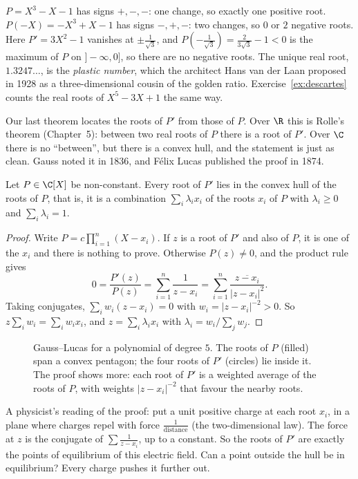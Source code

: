 \begin{examplex}
$P=X^3-X-1$ has signs $+,-,-$: one change, so exactly one positive root. $P(-X)=-X^3+X-1$ has signs $-,+,-$: two changes, so $0$ or $2$ negative
roots. Here $P'=3X^2-1$ vanishes at $\pm\frac1{\sqrt3}$, and $P(-\frac1{\sqrt3})=\frac2{3\sqrt3}-1<0$ is the maximum of $P$ on $]-\infty,0]$, so
there are no negative roots. The unique real root, $1.3247\ldots$, is the \emph{plastic number}, which the architect Hans van der Laan proposed in
1928 as a three-dimensional cousin of the golden ratio. Exercise~\ref{ex:descartes} counts the real roots of $X^5-3X+1$ the same way.
\end{examplex}

Our last theorem locates the roots of $P'$ from those of $P$. Over $\R$ this is Rolle's theorem (Chapter~5): between two real roots of $P$ there is
a root of $P'$. Over $\C$ there is no ``between'', but there is a convex hull, and the statement is just as clean. Gauss noted it in 1836, and
F\'elix Lucas published the proof in 1874.

\begin{theorem}\label{thm:gausslucas}
Let $P\in\C[X]$ be non-constant. Every root of $P'$ lies in the convex hull of the roots of $P$, that is, it is a combination
$\sum_i\lambda_ix_i$ of the roots $x_i$ of $P$ with $\lambda_i\ge0$ and $\sum_i\lambda_i=1$.
\end{theorem}
\begin{proof}
Write $P=c\prod_{i=1}^n(X-x_i)$. If $z$ is a root of $P'$ and also of $P$, it is one of the $x_i$ and there is nothing to prove. Otherwise $P(z)\ne0$,
and the product rule gives
\[
0=\frac{P'(z)}{P(z)}=\sum_{i=1}^n\frac1{z-x_i}=\sum_{i=1}^n\frac{\overline{z-x_i}}{|z-x_i|^2}.
\]
Taking conjugates, $\sum_iw_i(z-x_i)=0$ with $w_i=|z-x_i|^{-2}>0$. So $z\sum_iw_i=\sum_iw_ix_i$, and $z=\sum_i\lambda_ix_i$ with
$\lambda_i=w_i/\sum_jw_j$.
\end{proof}

\begin{figure}[ht]
\centering
{}
\caption{Gauss--Lucas for a polynomial of degree $5$. The roots of $P$ (filled) span a convex pentagon; the four roots of $P'$ (circles) lie inside it. The proof shows more: each root of $P'$ is a weighted average of the roots of $P$, with weights $|z-x_i|^{-2}$ that favour the nearby roots.}
\label{fig:gausslucas}
\end{figure}

\begin{think}
A physicist's reading of the proof: put a unit positive charge at each root $x_i$, in a plane where charges repel with force $\frac1{\text{distance}}$ (the two-dimensional law). The force at $z$ is the conjugate of $\sum\frac1{z-x_i}$, up to a constant. So the roots of $P'$ are exactly the points of equilibrium of this electric field. Can a point outside the hull be in equilibrium? Every charge pushes it further out.
\end{think}

